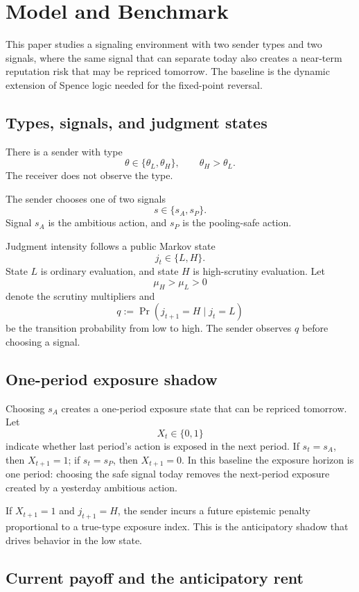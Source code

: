 
\section{Model and Benchmark}
\label{sec:primal-model}

This paper studies a signaling environment with two sender types and two signals, where the same signal that can separate today also creates a near-term reputation risk that may be repriced tomorrow. The baseline is the dynamic extension of Spence logic needed for the fixed-point reversal.

\subsection{Types, signals, and judgment states}

There is a sender with type
\[
\theta\in\{\theta_L,\theta_H\},\qquad \theta_H>\theta_L.
\]
The receiver does not observe the type.

The sender chooses one of two signals
\[
s\in\{s_A,s_P\}.
\]
Signal $s_A$ is the ambitious action, and $s_P$ is the pooling-safe action.

Judgment intensity follows a public Markov state
\[
j_t\in\{L,H\}.
\]
State $L$ is ordinary evaluation, and state $H$ is high-scrutiny evaluation. Let
\[
\mu_H>\mu_L>0
\]
denote the scrutiny multipliers and
\[
q:=\Pr(j_{t+1}=H\mid j_t=L)
\]
be the transition probability from low to high. The sender observes $q$ before choosing a signal.

\subsection{One-period exposure shadow}

Choosing $s_A$ creates a one-period exposure state that can be repriced tomorrow. Let
\[
X_t\in\{0,1\}
\]
indicate whether last period's action is exposed in the next period. If $s_t=s_A$, then $X_{t+1}=1$; if $s_t=s_P$, then $X_{t+1}=0$. In this baseline the exposure horizon is one period: choosing the safe signal today removes the next-period exposure created by a yesterday ambitious action.

If $X_{t+1}=1$ and $j_{t+1}=H$, the sender incurs a future epistemic penalty proportional to a true-type exposure index. This is the anticipatory shadow that drives behavior in the low state.

\subsection{Current payoff and the anticipatory rent}

